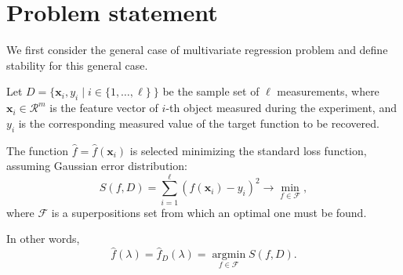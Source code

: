 \documentclass[11pt,a4paper]{article}
\theoremstyle{definition}
\begin{document}
\section{Problem statement}
\label{sect:prob_stat}

We first consider the general case of multivariate regression problem and define
stability for this general case.

Let $D = \{ \mathbf{x}_i, y_i \mid i \in \{ 1, \dots, \ell \} \ \}$ be the sample
set of $\ell$ measurements, where $\mathbf{x}_i \in \mathcal{R}^m$ is the feature vector of $i$-th
object measured during the experiment, and $y_i$ is the corresponding measured
value of the target function to be recovered.

The function $\hat{f} = \hat{f}({\mathbf{x}_i})$ is
selected minimizing the standard loss function, assuming Gaussian error distribution:
\begin{equation}
  S(f, D) = \sum_{i = 1}^\ell (f(\mathbf{x}_i) - y_i)^2 \rightarrow \min_{f \in \mathcal{F}},
  \label{eq:s_common}
\end{equation}
where $\mathcal{F}$ is a superpositions set from which an optimal one must be found.

In other words,
\begin{equation}
  \hat{f}(\lambda) = \hat{f}_D(\lambda) = \mathop{\arg \min}\limits_{f \in \mathcal{F}} S(f, D).
  \label{eq:fhat}
\end{equation}

\end{document}
